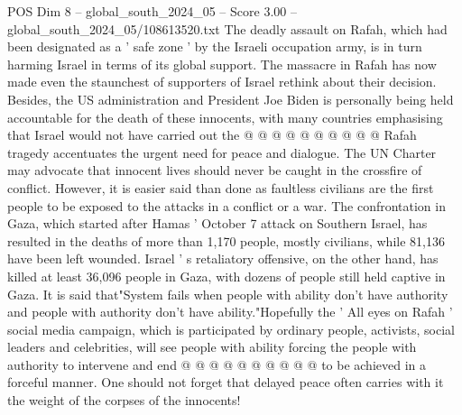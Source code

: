 \begin{textsample}{POS Dim 8 – global\_south\_2024\_05 – Score 3.00 – global\_south\_2024\_05/108613520.txt}
The deadly assault on Rafah, which had been designated as a ' safe zone ' by the Israeli occupation army, is in turn harming Israel in terms of its global support.
The massacre in Rafah has now made even the staunchest of supporters of Israel rethink about their decision.
Besides, the US administration and President Joe Biden is personally being held accountable for the death of these innocents, with many countries emphasising that Israel would not have carried out the @ @ @ @ @ @ @ @ @ @ Rafah tragedy accentuates the urgent need for peace and dialogue.
The UN Charter may advocate that innocent lives should never be caught in the crossfire of conflict.
However, it is easier said than done as faultless civilians are the first people to be exposed to the attacks in a conflict or a war.
The confrontation in Gaza, which started after Hamas ' October 7 attack on Southern Israel, has resulted in the deaths of more than 1,170 people, mostly civilians, while 81,136 have been left wounded.
Israel ' s retaliatory offensive, on the other hand, has killed at least 36,096 people in Gaza, with dozens of people still held captive in Gaza.
It is said that"System fails when people with ability don't have authority and people with authority don't have ability."Hopefully the ' All eyes on Rafah ' social media campaign, which is participated by ordinary people, activists, social leaders and celebrities, will see people with ability forcing the people with authority to intervene and end @ @ @ @ @ @ @ @ @ @ to be achieved in a forceful manner.
One should not forget that delayed peace often carries with it the weight of the corpses of the innocents!

\end{textsample}
